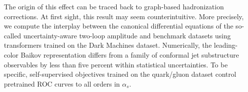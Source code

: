 The origin of this effect can be traced back to graph-based
hadronization corrections. At first sight, this result may seem
counterintuitive. More precisely, we compute the interplay between the
canonical differential equations of the so-called uncertainty-aware
two-loop amplitude and benchmark datasets using transformers trained on
the Dark Machines dataset. Numerically, the leading-color Baikov
representation differs from a family of conformal jet substructure
observables by less than five percent within statistical uncertainties.
To be specific, self-supervised objectives trained on the quark/gluon
dataset control pretrained ROC curves to all orders in $\alpha_s$.

